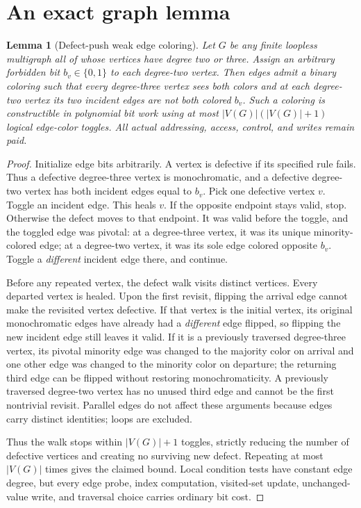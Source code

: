 \documentclass[11pt]{article}
\newtheorem{lemma}[theorem]{Lemma}
\begin{document}
\section{An exact graph lemma}
\begin{lemma}[Defect-push weak edge coloring]
Let $G$ be any finite loopless multigraph all of whose vertices have degree two or three. Assign an arbitrary forbidden bit $b_v\in\{0,1\}$ to each degree-two vertex. Then edges admit a binary coloring such that every degree-three vertex sees both colors and at each degree-two vertex its two incident edges are \emph{not both} colored $b_v$. Such a coloring is constructible in polynomial bit work using at most $|V(G)|(|V(G)|+1)$ \emph{logical edge-color toggles}. All actual addressing, access, control, and writes remain paid.
\end{lemma}
\begin{proof}
Initialize edge bits arbitrarily. A vertex is defective if its specified rule fails. Thus a defective degree-three vertex is monochromatic, and a defective degree-two vertex has both incident edges equal to $b_v$. Pick one defective vertex $v$. Toggle an incident edge. This heals $v$. If the opposite endpoint stays valid, stop. Otherwise the defect moves to that endpoint. It was valid before the toggle, and the toggled edge was pivotal: at a degree-three vertex, it was its unique minority-colored edge; at a degree-two vertex, it was its sole edge colored opposite $b_v$. Toggle a \emph{different} incident edge there, and continue.

Before any repeated vertex, the defect walk visits distinct vertices. Every departed vertex is healed. Upon the first revisit, flipping the arrival edge cannot make the revisited vertex defective. If that vertex is the initial vertex, its original monochromatic edges have already had a \emph{different} edge flipped, so flipping the new incident edge still leaves it valid. If it is a previously traversed degree-three vertex, its pivotal minority edge was changed to the majority color on arrival and one other edge was changed to the minority color on departure; the returning third edge can be flipped without restoring monochromaticity. A previously traversed degree-two vertex has no unused third edge and cannot be the first nontrivial revisit. Parallel edges do not affect these arguments because edges carry distinct identities; loops are excluded.

Thus the walk stops within $|V(G)|+1$ toggles, strictly reducing the number of defective vertices and creating no surviving new defect. Repeating at most $|V(G)|$ times gives the claimed bound. Local condition tests have constant edge degree, but every edge probe, index computation, visited-set update, unchanged-value write, and traversal choice carries ordinary bit cost.
\end{proof}
\end{document}

